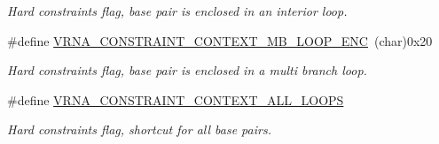 \begin{DoxyCompactItemize}
\begin{DoxyCompactList}\small\item\em Hard constraints flag, base pair is enclosed in an interior loop. \end{DoxyCompactList}\item 
\hypertarget{group__hard__constraints_ga02a3d703ddbcfce393e4bbfcb9db7077}{}\#define \hyperlink{group__hard__constraints_ga02a3d703ddbcfce393e4bbfcb9db7077}{V\+R\+N\+A\+\_\+\+C\+O\+N\+S\+T\+R\+A\+I\+N\+T\+\_\+\+C\+O\+N\+T\+E\+X\+T\+\_\+\+M\+B\+\_\+\+L\+O\+O\+P\+\_\+\+E\+N\+C}~(char)0x20\label{group__hard__constraints_ga02a3d703ddbcfce393e4bbfcb9db7077}

\begin{DoxyCompactList}\small\item\em Hard constraints flag, base pair is enclosed in a multi branch loop. \end{DoxyCompactList}\item 
\hypertarget{group__hard__constraints_ga886d9127c49bb982a4b67cd7581e8a5a}{}\#define \hyperlink{group__hard__constraints_ga886d9127c49bb982a4b67cd7581e8a5a}{V\+R\+N\+A\+\_\+\+C\+O\+N\+S\+T\+R\+A\+I\+N\+T\+\_\+\+C\+O\+N\+T\+E\+X\+T\+\_\+\+A\+L\+L\+\_\+\+L\+O\+O\+P\+S}\label{group__hard__constraints_ga886d9127c49bb982a4b67cd7581e8a5a}

\begin{DoxyCompactList}\small\item\em Hard constraints flag, shortcut for all base pairs. \end{DoxyCompactList}\end{DoxyCompactItemize}
